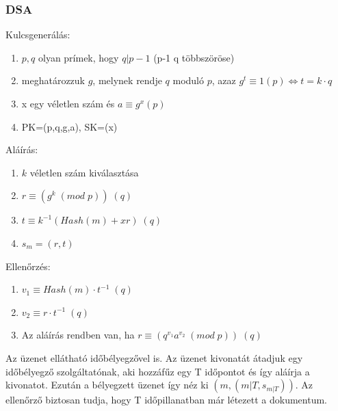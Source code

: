 \subsubsection{DSA}
\begin{multicols}{2}
Kulcsgenerálás:
\begin{enumerate}[nosep]
	\item $p, q$ olyan prímek, hogy $q|p-1$ (p-1 q többszöröse)
	\item meghatározzuk $g$, melynek rendje $q$ moduló $p$, azaz $g^t \equiv 1 (p) \Leftrightarrow t= k\cdot q$
	\item x egy véletlen szám és $a \equiv g^x (p)$
	\item PK=(p,q,g,a), SK=(x)
\end{enumerate}
Aláírás:
\begin{enumerate}[nosep]
	\item $k$ véletlen szám kiválasztása
	\item $r \equiv (g^k\;(mod\;p))\; (q)$
	\item $t \equiv k^{-1}(Hash(m)+xr)\; (q)$
	\item $s_m = (r,t)$
\end{enumerate}
Ellenőrzés:
\begin{enumerate}[nosep]
	\item $v_1 \equiv Hash(m)\cdot t^{-1}\; (q)$
	\item $v_2 \equiv r\cdot t^{-1}\; (q)$
	\item Az aláírás rendben van, ha $r \equiv (q^{v_1}a^{v_2}\;(mod\;p))\;(q)$
\end{enumerate}
\end{multicols}
Az üzenet ellátható időbélyegzővel is. Az üzenet kivonatát átadjuk egy időbélyegző szolgáltatónak, aki hozzáfűz egy T időpontot és így aláírja a kivonatot. Ezután a bélyegzett üzenet így néz ki $(m,(m|T,s_{m|T}))$. Az ellenőrző biztosan tudja, hogy T időpillanatban már létezett a dokumentum.